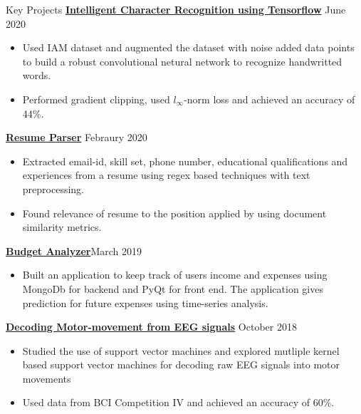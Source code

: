 \documentclass{resume} %
\begin{document}
\begin{rSection}{Key Projects}
\vspace*{0.1in}
{ \bf \href{https://github.com/arunpalaniappan/Handwriting-Recognition-using-Tensorflow}{Intelligent Character Recognition using Tensorflow}} {\hfill June 2020}
\begin{itemize}
\item Used IAM dataset and augmented the dataset with noise added data points to build a robust convolutional netural network to recognize handwritted words.
\item Performed gradient clipping, used $l_{\infty}$-norm loss and achieved an accuracy of 44\%.
\end{itemize}

{\bf \href{https://github.com/arunpalaniappan/resume-parser}{Resume Parser}} {\hfill Febraury 2020}
\begin{itemize}
\item Extracted email-id, skill set, phone number, educational qualifications and experiences from a resume using regex based techniques with text preprocessing.
\item Found relevance of resume to the position applied by using document similarity metrics.
\end{itemize}

{\bf \href{https://github.com/arunpalaniappan/budget-analyzer}{Budget Analyzer}}{\hfill March 2019}
\begin{itemize}
\item Built an application to keep track of users income and expenses using MongoDb for backend and PyQt for front end.  The application gives prediction for future expenses using time-series analysis.
\end{itemize}

{\bf \href{https://github.com/arunpalaniappan/Decoding-raw-EEG-signals}{Decoding Motor-movement from EEG signals}} {\hfill October 2018}
\begin{itemize}
\item Studied the use of support vector machines and explored mutliple kernel based support vector machines for decoding raw EEG signals into motor movements
\item Used data from BCI Competition IV and achieved an accuracy of 60\%.
\end{itemize}

\end{rSection}

\pagebreak
\end{document}
